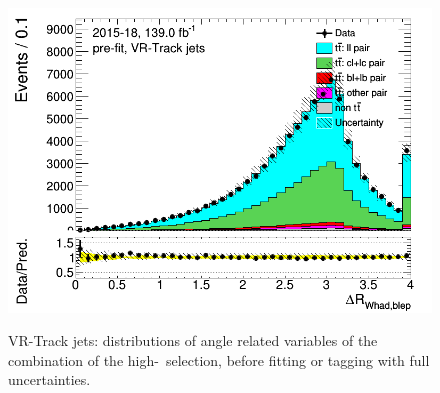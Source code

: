 \begin{figure}[H]
\includegraphics[width=.45\textwidth]{FTAG_plots/pretagNoRwnewonlyVRJetsall/DataMC_h_dRWhadbleptrackjet.png} \\
\caption{VR-Track jets: distributions of angle related variables of the combination 
of the high-\pt\ selection, before fitting or tagging with full uncertainties.} \label{fig:highpT_angles_VRJets}
\end{figure}

